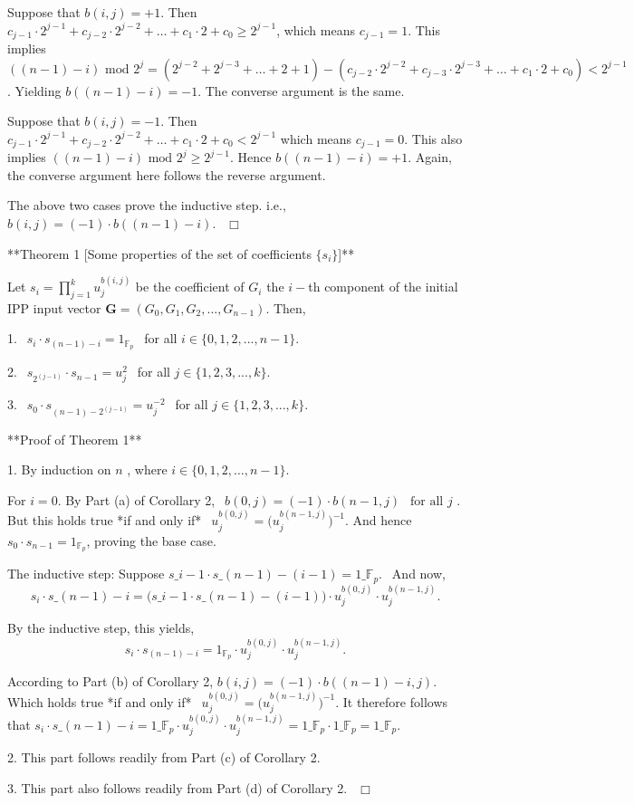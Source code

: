 Suppose that  $ b(i, j) = +1 $. Then  $ c_{j-1} \cdot 2^{j-1} + c_{j-2} \cdot 2^{j-2} + \dots + c_1 \cdot 2 + c_0 \geq 2^{j-1}$, which means  $ c_{j-1}  =  1$. This implies  $ ((n-1)-i) \text{ mod } 2^j = (2^{j-2} + 2^{j-3} + \dots +  2 + 1) - (c_{j-2} \cdot 2^{j-2} + c_{j-3} \cdot 2^{j-3} + \dots + c_1 \cdot 2 + c_0) < 2^{j-1} $. Yielding  $ b((n-1)-i) = -1 $. The converse argument is the same. 

Suppose that  $  b(i, j) = -1 $. Then  $ c_{j-1} \cdot 2^{j-1} + c_{j-2} \cdot 2^{j-2} + \dots + c_1 \cdot 2 + c_0 < 2^{j-1} $ which means  $ c_{j-1}  = 0 $. This also implies $  ((n-1)-i) \text{ mod } 2^j \geq 2^{j-1} $.  Hence  $ b((n-1)-i) = +1 $.  Again, the converse argument here follows the reverse argument. 

The above two cases prove the inductive step. i.e., $  b(i, j) = (-1) \cdot b((n-1)-i) $.  $ \ \ \Box $





**Theorem 1 [Some properties of the set of coefficients $\{ s_i \}$]** 

Let  $s_i = \prod\limits_{j = 1}^k u_j^{b(i,j)}$  be the coefficient of  $G_i$  the $i-$th component of the initial IPP input vector $\mathbf{G} = ( G_0 , G_1 , G_2 , ... , G_{n-1})$.  Then, 

1.	$\ \ s_i \cdot s_{(n-1) - i} = 1_{\mathbb{F}_p}\ \ $ for all $i \in \{ 0, 1, 2, ... , n-1 \}$.

2.	$\ \ s_{2^{(j-1)}} \cdot s_{n-1} = u_j^2\ \ $ for all $j \in \{ 1, 2, 3, ... , k \}$.

3.	$\ \ s_0 \cdot s_{(n-1) - 2^{(j-1)}} = u_j^{-2}\ \ $ for all $j \in \{ 1, 2, 3, ... , k \}$.



**Proof of Theorem 1** 

1. By induction on  $n$ , where  $ i \in \{ 0, 1, 2, \dots , n-1 \} $.  

   For  $ i = 0 $. By Part (a)  of  Corollary 2,  $\ \ b(0,j) = (-1) \cdot b(n-1,j)\ \ \text{ for all } j $ . But this holds true *if and only if*  $ \  \  u_j^{b(0,j)} = \Big( u_j^{b(n-1,j)} \Big)^{-1} $.  And hence  $ s_0 \cdot s_{n-1}  =  1_{\mathbb{F}_p} $,  proving the base case. 

   The inductive step: Suppose  $ s\_{i-1} \cdot s\_{(n-1) - (i-1)}  =  1\_{\mathbb{F}_p}  .\ \ $  And now,  $$ s_i \cdot s\_{(n-1)-i} = \big( s\_{i-1} \cdot s\_{(n-1) - (i-1)} \big) \cdot u_j^{b(0,j)} \cdot u_j^{b(n-1,j)} .$$  

   By the inductive step, this yields,  $$ s_i \cdot s_{(n-1)-i} = 1_{\mathbb{F}_p} \cdot u_j^{b(0,j)} \cdot u_j^{b(n-1,j)} .$$ 

   According to Part (b) of Corollary 2,  $b(i,j) = (-1) \cdot b((n-1)-i,j)$. Which holds true *if and only if*  $\ \  u_j^{b(0,j)} = \Big( u_j^{b(n-1,j)} \Big)^{-1} .$  It therefore follows that  $  s_i \cdot s\_{(n-1)-i} = 1\_{\mathbb{F}_p} \cdot u_j^{b(0,j)} \cdot u_j^{b(n-1,j)} = 1\_{\mathbb{F}_p} \cdot 1\_{\mathbb{F}_p} = 1\_{\mathbb{F}_p}$. 

2. This part follows readily from  Part (c)  of  Corollary 2.      

3. This part also follows readily from  Part (d)  of  Corollary 2.    $ \ \ \Box$  


